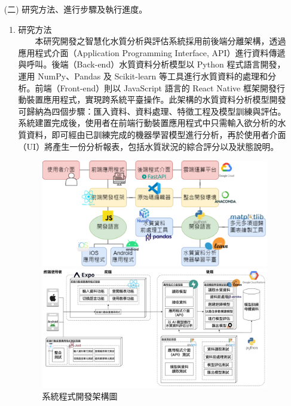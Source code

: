 \documentclass[12pt,a4paper]{article}
\begin{document}
\begin{enumerate}
\item[(二)] 研究方法、進行步驟及執行進度。
\begin{enumerate}[label=\arabic*.]
\item 研究方法\\
　　本研究開發之智慧化水質分析與評估系統採用前後端分離架構，透過應用程式介面（Application Programming Interface, API）進行資料傳遞與呼叫。後端（Back-end）水質資料分析模型以 Python 程式語言開發，運用 NumPy、Pandas 及 Scikit-learn 等工具進行水質資料的處理和分析。前端（Front-end）則以 JavaScript 語言的 React Native 框架開發行動裝置應用程式，實現跨系統平臺操作。此架構的水質資料分析模型開發可歸納為四個步驟：匯入資料、資料處理、特徵工程及模型訓練與評估。系統建置完成後，使用者在前端行動裝置應用程式中只需輸入欲分析的水質資料，即可經由已訓練完成的機器學習模型進行分析，再於使用者介面（UI）將產生一份分析報表，包括水質狀況的綜合評分以及狀態說明。\\
    \begin{figure}[H]
        \centering
        \begin{minipage}{0.45\textwidth}
            \centering
            \includegraphics[width=\textwidth]{resources/image/開發架構圖.png}
            \caption{系統程式開發架構圖}
            \label{fig:development_architecture}
        \end{minipage}%
        \hfill
        \begin{minipage}{0.45\textwidth}
            \centering
            \includegraphics[width=\textwidth]{resources/image/部署圖.jpg}

\end{minipage}
\end{figure}
\end{enumerate}
\end{enumerate}
\end{document}
